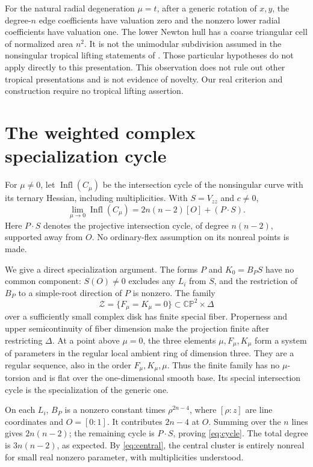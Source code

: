 \documentclass[11pt,a4paper]{article}
\theoremstyle{remark}
\newcommand{\CP}{\mathbb {CP}}
\newcommand{\Infl}{\operatorname{Infl}}
\begin{document}
For the natural radial degeneration \(\mu=t\), after a generic
rotation of \(x,y\), the degree-\(n\) edge coefficients have
valuation zero and the nonzero lower radial coefficients have
valuation one. The lower Newton hull has a coarse triangular
cell of normalized area \(n^2\). It is not the unimodular
subdivision assumed in the nonsingular tropical lifting
statements of \citep[Theorems~5.6--5.7]{brugallelopez}.
Those particular hypotheses do not apply directly to this
presentation. This observation does not rule out other
tropical presentations and is not evidence of novelty.
Our real criterion and construction require no tropical
lifting assertion.

\appendix
\section{The weighted complex specialization cycle}\label{app:cycle}

For \(\mu\ne0\), let \(\Infl(C_\mu)\) be the intersection
cycle of the nonsingular curve with its ternary Hessian,
including multiplicities. With \(S=V_{zz}\) and \(c\ne0\),
\begin{equation}\label{eq:cycle}
 \lim_{\mu\to0}\Infl(C_\mu)
                  =2n(n-2)[O]+(P\cdot S).
\end{equation}
Here \(P\cdot S\) denotes the projective intersection cycle,
of degree \(n(n-2)\), supported away from \(O\). No
ordinary-flex assumption on its nonreal points is made.

We give a direct specialization argument. The forms \(P\)
and \(K_0=B_PS\) have no common component: \(S(O)\ne0\)
excludes any \(L_i\) from \(S\), and the restriction of \(B_P\)
to a simple-root direction of \(P\) is nonzero.
The family
\[
 \mathcal Z=\{F_\mu=K_\mu=0\}\subset\CP^2\times\Delta
\]
over a sufficiently small complex disk has finite special
fiber. Properness and upper semicontinuity of fiber dimension
make the projection finite after restricting \(\Delta\).
At a point above \(\mu=0\), the three elements
\(\mu,F_\mu,K_\mu\) form a system of parameters in the
regular local ambient ring of dimension three. They are
a regular sequence, also in the order \(F_\mu,K_\mu,\mu\).
Thus the finite family has no \(\mu\)-torsion and is flat
over the one-dimensional smooth base. Its special
intersection cycle is the specialization of the generic one.

On each \(L_i\), \(B_P\) is a nonzero constant times
\(\rho^{2n-4}\), where \([\rho:z]\) are line coordinates
and \(O=[0:1]\). It contributes \(2n-4\) at \(O\).
Summing over the \(n\) lines gives \(2n(n-2)\); the
remaining cycle is \(P\cdot S\), proving \eqref{eq:cycle}.
The total degree is \(3n(n-2)\), as expected.
By \eqref{eq:central}, the central cluster is entirely
nonreal for small real nonzero parameter, with multiplicities
understood.
\end{document}
